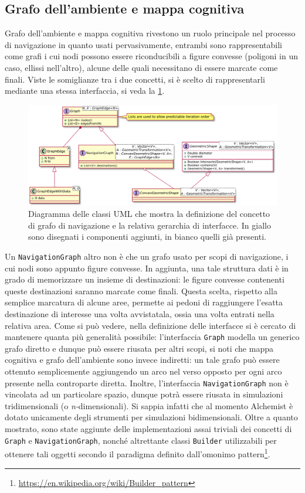 \documentclass[12pt,a4paper,openright,oneside]{book}
\begin{document}
\subsection{Grafo dell'ambiente e mappa cognitiva}
Grafo dell'ambiente e mappa cognitiva rivestono un ruolo principale nel processo di navigazione in quanto usati pervasivamente, entrambi sono rappresentabili come grafi i cui nodi possono essere riconducibili a figure convesse (poligoni in un caso, ellissi nell'altro), alcune delle quali necessitano di essere marcate come finali. Viste le somiglianze tra i due concetti, si è scelto di rappresentarli mediante una stessa interfaccia, si veda la \cref{fig:graph}.
\begin{figure}
	\centering
	\includegraphics[width=\linewidth]{figures/graph.pdf}
	\caption{Diagramma delle classi UML che mostra la definizione del concetto di grafo di navigazione e la relativa gerarchia di interfacce. In giallo sono disegnati i componenti aggiunti, in bianco quelli già presenti.}
	\label{fig:graph}
\end{figure}
Un \texttt{NavigationGraph} altro non è che un grafo usato per scopi di navigazione, i cui nodi sono appunto figure convesse. In aggiunta, una tale struttura dati è in grado di memorizzare un insieme di destinazioni: le figure convesse contenenti queste destinazioni saranno marcate come finali. Questa scelta, rispetto alla semplice marcatura di alcune aree, permette ai pedoni di raggiungere l'esatta destinazione di interesse una volta avvistatala, ossia una volta entrati nella relativa area. Come si può vedere, nella definizione delle interfacce si è cercato di mantenere quanta più generalità possibile: l'interfaccia \texttt{Graph} modella un generico grafo diretto e dunque può essere riusata per altri scopi, si noti che mappa cognitiva e grafo dell'ambiente sono invece indiretti: un tale grafo può essere ottenuto semplicemente aggiungendo un arco nel verso opposto per ogni arco presente nella controparte diretta. Inoltre, l'interfaccia \texttt{NavigationGraph} non è vincolata ad un particolare spazio, dunque potrà essere riusata in simulazioni tridimensionali (o \emph{n-}dimensionali). Si sappia infatti che al momento Alchemist è dotato unicamente degli strumenti per simulazioni bidimensionali. Oltre a quanto mostrato, sono state aggiunte delle implementazioni assai triviali dei concetti di \texttt{Graph} e \texttt{NavigationGraph}, nonché altrettante classi \texttt{Builder} utilizzabili per ottenere tali oggetti secondo il paradigma definito dall'omonimo pattern\footnote{\url{https://en.wikipedia.org/wiki/Builder_pattern}}.
\end{document}
